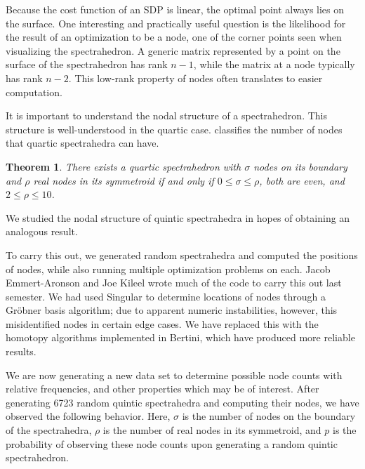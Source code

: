 \documentclass[12pt]{amsart}
\theoremstyle{plain}
\newtheorem{theorem}{Theorem}
\theoremstyle{definition}
\begin{document}
Because the cost function of an SDP is linear, the optimal point
always lies on the surface.  One interesting and practically useful
question is the likelihood for the result of an optimization to be a
node, one of the corner points seen when visualizing the
spectrahedron.  A generic matrix represented by a point on the surface
of the spectrahedron has rank $n-1$, while the matrix at a node
typically has rank $n-2$.  This low-rank property of nodes often
translates to easier computation.

It is important to understand the nodal structure of a spectrahedron. 
This structure is well-understood in the quartic case. 
\cite{OKSV} classifies the number of nodes that quartic spectrahedra can have. 
\begin{theorem}\label{quartic}
	There exists a quartic spectrahedron with $\sigma$ nodes on its boundary and
	$\rho$ real nodes in its symmetroid if and only if $0 \le \sigma \le \rho$,
	both are even, and $2 \le \rho \le 10$.
\end{theorem} 
We studied the nodal structure of quintic spectrahedra in hopes of obtaining an
analogous result.

To carry this out, we generated random spectrahedra and computed
the positions of nodes, while also running multiple optimization
problems on each.  Jacob Emmert-Aronson and Joe Kileel wrote much of
the code to carry this out last semester.  
We had used Singular
to determine locations of nodes through a Gr\"obner basis algorithm;
due to apparent numeric instabilities, however, this misidentified
nodes in certain edge cases.  We have replaced this with the
homotopy algorithms implemented in Bertini, which have produced more
reliable results.  

We are now generating a new data set to determine possible node counts with
relative frequencies, and other properties which may be of interest.  After
generating 6723 random quintic spectrahedra and computing their nodes, we have
observed the following behavior. Here, $\sigma$ is the number of nodes on the
boundary of the spectrahedra, $\rho$ is the number of real nodes in its
symmetroid, and $p$ is the probability of observing these node counts upon
generating a random quintic spectrahedron.
\end{document}
